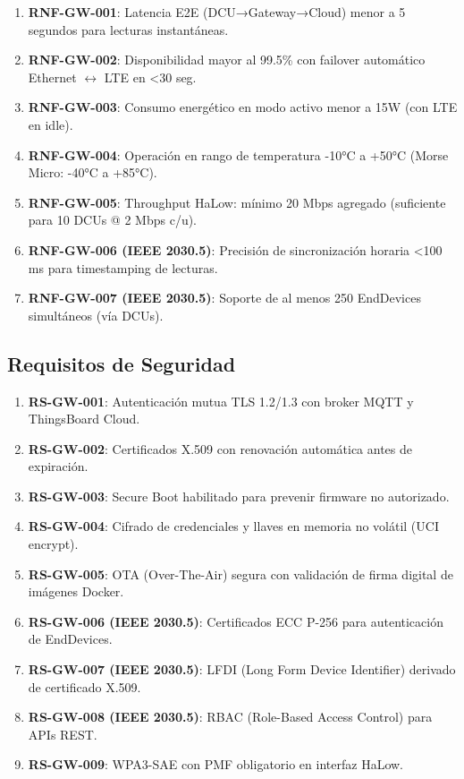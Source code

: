 \begin{enumerate}
    \item \textbf{RNF-GW-001}: Latencia E2E (DCU→Gateway→Cloud) menor a 5 segundos para lecturas instantáneas.
    \item \textbf{RNF-GW-002}: Disponibilidad mayor al 99.5\% con failover automático Ethernet $\leftrightarrow$ LTE en <30 seg.
    \item \textbf{RNF-GW-003}: Consumo energético en modo activo menor a 15W (con LTE en idle).
    \item \textbf{RNF-GW-004}: Operación en rango de temperatura -10°C a +50°C (Morse Micro: -40°C a +85°C).
    \item \textbf{RNF-GW-005}: Throughput HaLow: mínimo 20 Mbps agregado (suficiente para 10 DCUs @ 2 Mbps c/u).
    \item \textbf{RNF-GW-006 (IEEE 2030.5)}: Precisión de sincronización horaria <100 ms para timestamping de lecturas.
    \item \textbf{RNF-GW-007 (IEEE 2030.5)}: Soporte de al menos 250 EndDevices simultáneos (vía DCUs).
\end{enumerate}

\subsection{Requisitos de Seguridad}

\begin{enumerate}
    \item \textbf{RS-GW-001}: Autenticación mutua TLS 1.2/1.3 con broker MQTT y ThingsBoard Cloud.
    \item \textbf{RS-GW-002}: Certificados X.509 con renovación automática antes de expiración.
    \item \textbf{RS-GW-003}: Secure Boot habilitado para prevenir firmware no autorizado.
    \item \textbf{RS-GW-004}: Cifrado de credenciales y llaves en memoria no volátil (UCI encrypt).
    \item \textbf{RS-GW-005}: OTA (Over-The-Air) segura con validación de firma digital de imágenes Docker.
    \item \textbf{RS-GW-006 (IEEE 2030.5)}: Certificados ECC P-256 para autenticación de EndDevices.
    \item \textbf{RS-GW-007 (IEEE 2030.5)}: LFDI (Long Form Device Identifier) derivado de certificado X.509.
    \item \textbf{RS-GW-008 (IEEE 2030.5)}: RBAC (Role-Based Access Control) para APIs REST.
    \item \textbf{RS-GW-009}: WPA3-SAE con PMF obligatorio en interfaz HaLow.
\end{enumerate}

